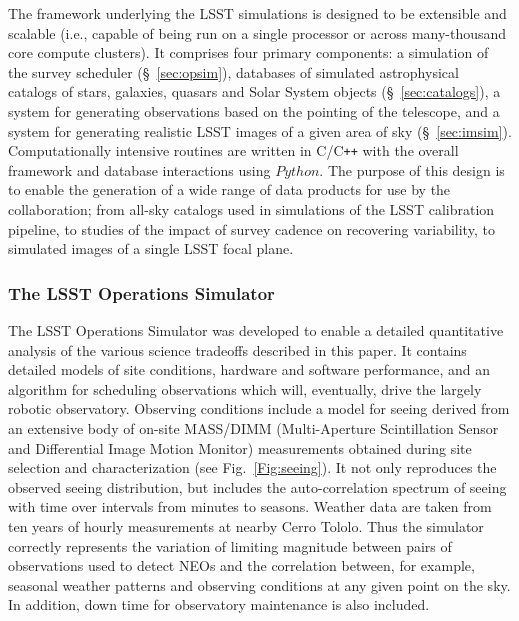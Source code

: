 The framework underlying the LSST simulations is designed to be
extensible and scalable (i.e., capable of being run on a single
processor or across many-thousand core compute clusters). It comprises
four primary components: a simulation of the survey scheduler
(\S~\ref{sec:opsim}),
databases of simulated astrophysical catalogs of stars, galaxies,
quasars and Solar System objects (\S~\ref{sec:catalogs}), a system for generating observations
based on the pointing of the telescope, and a system for generating
realistic LSST images of a given area of sky
(\S~\ref{sec:imsim}). Computationally intensive routines are written
in C/C\texttt{++} with the overall framework and database interactions
using $Python$.  The purpose of this design is to enable the
generation of a wide range of data products for use by the
collaboration; from all-sky catalogs used in simulations of the LSST
calibration pipeline, to studies of the impact of survey cadence on
recovering variability, to simulated images of a single LSST focal
plane.


\subsubsection{ The LSST Operations Simulator \label{sec:opsim}}

The LSST Operations Simulator \citep{2014SPIE.9150E..15D} was developed to enable a
detailed quantitative analysis of the various science tradeoffs described in
this paper. It contains detailed models of site conditions, hardware and
software performance, and an algorithm for scheduling observations which will,
eventually, drive the largely robotic observatory.
Observing conditions include a model for seeing derived from an extensive body
of on-site MASS/DIMM (Multi-Aperture Scintillation Sensor and Differential
Image Motion Monitor) measurements obtained during site selection and
characterization (see Fig.~\ref{Fig:seeing}). It not only reproduces the
observed seeing distribution, but includes
the auto-correlation spectrum of seeing with time over intervals from minutes
to seasons. Weather data are taken from ten years of hourly measurements at
nearby Cerro Tololo.
Thus the simulator correctly represents the variation of limiting
magnitude between pairs of observations used to detect NEOs and the
correlation between, for example, seasonal weather patterns and observing
conditions at any given point on the sky.  In addition, down time for
observatory maintenance is also included.

